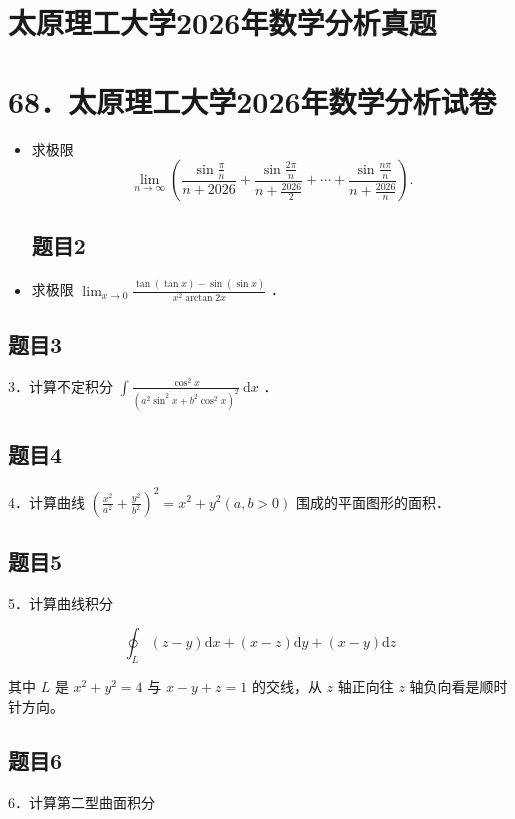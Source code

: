 \documentclass{article}
\begin{document}
\section*{太原理工大学2026年数学分析真题}
\section*{68．太原理工大学2026年数学分析试卷}
\begin{itemize}

\subsection{题目1}
  \item[1．] 求极限
\[
\lim _{n \rightarrow \infty}\left(\frac{\sin \frac{\pi}{n}}{n+2026}+\frac{\sin \frac{2 \pi}{n}}{n+\frac{2026}{2}}+\cdots+\frac{\sin \frac{n \pi}{n}}{n+\frac{2026}{n}}\right) .
\]

\subsection{题目2}
  \item[2．] 求极限 \(\lim _{x \rightarrow 0} \frac{\tan (\tan x)-\sin (\sin x)}{x^{2} \arctan 2 x}\) ．
\end{itemize}

\subsection{题目3}
3．计算不定积分 \(\int \frac{\cos ^{2} x}{\left(a^{2} \sin ^{2} x+b^{2} \cos ^{2} x\right)^{2}} \mathrm{~d} x\) ．

\subsection{题目4}
4．计算曲线 \(\left(\frac{x^{2}}{a^{2}}+\frac{y^{2}}{b^{2}}\right)^{2}=x^{2}+y^{2}(a, b>0)\) 围成的平面图形的面积．

\subsection{题目5}
5．计算曲线积分

\[
\oint_{L}(z-y) \mathrm{d} x+(x-z) \mathrm{d} y+(x-y) \mathrm{d} z
\]

其中 \(L\) 是 \(x^{2}+y^{2}=4\) 与 \(x-y+z=1\) 的交线，从 \(z\) 轴正向往 \(z\) 轴负向看是顺时针方向。

\subsection{题目6}
6．计算第二型曲面积分
\end{document}
